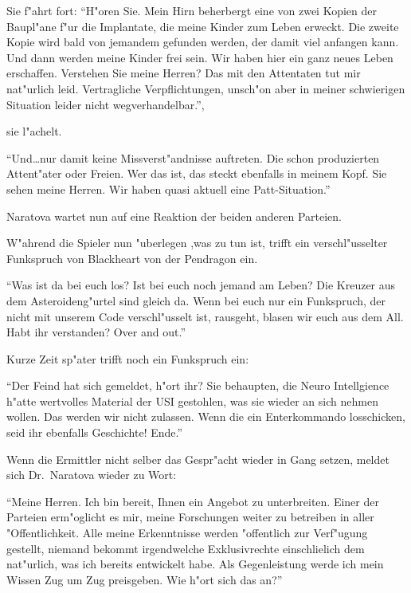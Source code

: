 Sie f"ahrt fort: "`H"oren Sie. Mein Hirn beherbergt eine von zwei Kopien der Baupl"ane f"ur die Implantate, die meine Kinder zum Leben erweckt. Die zweite Kopie wird bald von jemandem gefunden werden, der damit viel anfangen kann. Und dann werden meine Kinder frei sein. Wir haben hier ein ganz neues Leben erschaffen. Verstehen Sie meine Herren? Das mit den Attentaten tut mir nat"urlich leid. Vertragliche Verpflichtungen, unsch"on aber in meiner schwierigen Situation leider nicht wegverhandelbar."',

sie l"achelt.

"`Und\dots{}nur damit keine Missverst"andnisse auftreten. Die schon produzierten Attent"ater oder Freien. Wer das ist, das steckt ebenfalls in meinem Kopf. Sie sehen meine Herren. Wir haben quasi aktuell eine Patt-Situation."'

Naratova wartet nun auf eine Reaktion der beiden anderen Parteien.

W"ahrend die Spieler nun "uberlegen ,was zu tun ist, trifft ein verschl"usselter Funkspruch von Blackheart von der Pendragon ein.

"`Was ist da bei euch los? Ist bei euch noch jemand am Leben? Die Kreuzer aus dem Asteroideng"urtel sind gleich da. Wenn bei euch nur ein Funkspruch, der nicht mit unserem Code verschl"usselt ist, rausgeht, blasen wir euch aus dem All. Habt ihr verstanden? Over and out."'

Kurze Zeit sp"ater trifft noch ein Funkspruch ein:

"`Der Feind hat sich gemeldet, h"ort ihr? Sie behaupten, die Neuro Intellgience h"atte wertvolles Material der USI gestohlen, was sie wieder an sich nehmen wollen. Das werden wir nicht zulassen. Wenn die ein Enterkommando losschicken, seid ihr ebenfalls Geschichte! Ende."'

Wenn die Ermittler nicht selber das Gespr"acht wieder in Gang setzen, meldet sich Dr.~Naratova wieder zu Wort:

"`Meine Herren. Ich bin bereit, Ihnen ein Angebot zu unterbreiten. Einer der Parteien erm"oglicht es mir, meine Forschungen weiter zu betreiben in aller "Offentlichkeit. Alle meine Erkenntnisse werden "offentlich zur Verf"ugung gestellt, niemand bekommt irgendwelche Exklusivrechte einschlie\3lich dem nat"urlich, was ich bereits entwickelt habe. Als Gegenleistung werde ich mein Wissen Zug um Zug preisgeben. Wie h"ort sich das an?"'

